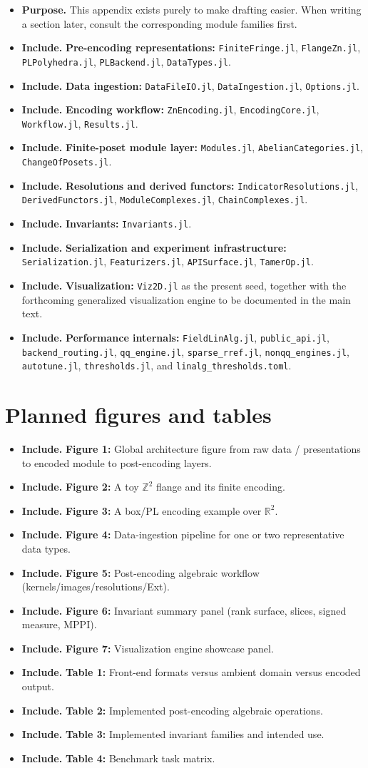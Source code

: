 \documentclass[11pt]{article}
\newcommand{\R}{\mathbb{R}}
\newenvironment{plan}{\begin{itemize}[leftmargin=1.6em,itemsep=0.35em,topsep=0.25em]}{\end{itemize}}
\newcommand{\purpose}[1]{\item \textbf{Purpose.} #1}
\newcommand{\includeitems}[1]{\item \textbf{Include.} #1}
\begin{document}
\begin{plan}
    \purpose{This appendix exists purely to make drafting easier. When writing a section later, consult the corresponding module families first.}
    \includeitems{\textbf{Pre-encoding representations:} \texttt{FiniteFringe.jl}, \texttt{FlangeZn.jl}, \texttt{PLPolyhedra.jl}, \texttt{PLBackend.jl}, \texttt{DataTypes.jl}.}
    \includeitems{\textbf{Data ingestion:} \texttt{DataFileIO.jl}, \texttt{DataIngestion.jl}, \texttt{Options.jl}.}
    \includeitems{\textbf{Encoding workflow:} \texttt{ZnEncoding.jl}, \texttt{EncodingCore.jl}, \texttt{Workflow.jl}, \texttt{Results.jl}.}
    \includeitems{\textbf{Finite-poset module layer:} \texttt{Modules.jl}, \texttt{AbelianCategories.jl}, \texttt{ChangeOfPosets.jl}.}
    \includeitems{\textbf{Resolutions and derived functors:} \texttt{IndicatorResolutions.jl}, \texttt{DerivedFunctors.jl}, \texttt{ModuleComplexes.jl}, \texttt{ChainComplexes.jl}.}
    \includeitems{\textbf{Invariants:} \texttt{Invariants.jl}.}
    \includeitems{\textbf{Serialization and experiment infrastructure:} \texttt{Serialization.jl}, \texttt{Featurizers.jl}, \texttt{APISurface.jl}, \texttt{TamerOp.jl}.}
    \includeitems{\textbf{Visualization:} \texttt{Viz2D.jl} as the present seed, together with the forthcoming generalized visualization engine to be documented in the main text.}
    \includeitems{\textbf{Performance internals:} \texttt{FieldLinAlg.jl}, \texttt{public\_api.jl}, \texttt{backend\_routing.jl}, \texttt{qq\_engine.jl}, \texttt{sparse\_rref.jl}, \texttt{nonqq\_engines.jl}, \texttt{autotune.jl}, \texttt{thresholds.jl}, and \texttt{linalg\_thresholds.toml}.}
\end{plan}

\section{Planned figures and tables}\label{app:figures}

\begin{plan}
    \includeitems{\textbf{Figure 1:} Global architecture figure from raw data / presentations to encoded module to post-encoding layers.}
    \includeitems{\textbf{Figure 2:} A toy $\mathbb{Z}^2$ flange and its finite encoding.}
    \includeitems{\textbf{Figure 3:} A box/PL encoding example over $\R^2$.}
    \includeitems{\textbf{Figure 4:} Data-ingestion pipeline for one or two representative data types.}
    \includeitems{\textbf{Figure 5:} Post-encoding algebraic workflow (kernels/images/resolutions/Ext).}
    \includeitems{\textbf{Figure 6:} Invariant summary panel (rank surface, slices, signed measure, MPPI).}
    \includeitems{\textbf{Figure 7:} Visualization engine showcase panel.}
    \includeitems{\textbf{Table 1:} Front-end formats versus ambient domain versus encoded output.}
    \includeitems{\textbf{Table 2:} Implemented post-encoding algebraic operations.}
    \includeitems{\textbf{Table 3:} Implemented invariant families and intended use.}
    \includeitems{\textbf{Table 4:} Benchmark task matrix.}
\end{plan}
\end{document}
